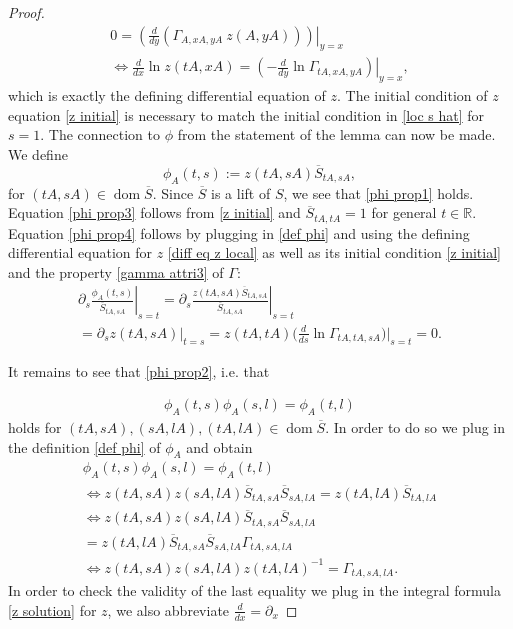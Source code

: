 \documentclass[b5paper,draft,openbib,12pt]{memoir}
\DeclareMathOperator{\dom}{dom}
\begin{document}
\begin{proof}
\begin{align}
0=\left.\left(\frac{d}{dy}(\Gamma_{ A, x A, y A} ~z( A, y A))\right)\right|_{y=x}\\
\iff \frac{d}{dx}\ln z(tA, xA)=\left.\left(-\frac{d}{dy}\ln \Gamma_{t A, xA, yA}\right)\right|_{y=x},
\end{align}
which is exactly the defining differential equation of \(z\). The initial condition of \(z\) equation \eqref{z initial} 
is necessary to match the initial condition in \eqref{loc s hat} for \(s=1\).
The connection to \(\phi\) from the statement of the lemma can now be made.
We define 
\begin{equation}\label{def phi}
\phi_A(t,s):=z(t A, s A) \overline{S}_{t A, s A},
\end{equation}
for \((tA,sA)\in\dom\overline{S}\). Since \(\overline{S}\) is a lift of \(S\), we see that
 \eqref{phi prop1} holds. Equation \eqref{phi prop3} follows from \eqref{z initial} and 
 \(\overline{S}_{tA, tA}=1\) for general \(t\in\mathbb{R}\).
 Equation \eqref{phi prop4} follows by plugging in 
\eqref{def phi} and using the defining differential equation for
 \(z\) \eqref{diff eq z local} as well as its initial 
condition \eqref{z initial} and the property 
\eqref{gamma attri3} of \(\Gamma\):
\begin{align}
\partial_s \left.\frac{\phi_A(t,s)}{\overline{S}_{t A,sA}}\right|_{s=t}
=\partial_s \left.\frac{z(tA,sA)\overline{S}_{t A, sA}}{\overline{S}_{t A, s A}}\right|_{s=t}\\
=\partial_s \left.z(tA, sA)\right|_{t=s}
=z(t A,t A)\bigg(\frac{d}{d s}\ln \Gamma_{t A, t A, s A}\bigg)\bigg|_{s=t}=0.
\end{align}


It remains to see that \eqref{phi prop2}, i.e. that 

\begin{align}\label{consistency phi}
\phi_A(t,s)\phi_A(s,l)=\phi_A(t,l)
\end{align}
holds for \((tA,sA),(sA,lA),(tA,lA)\in\dom\overline{S}\). 
In order to do so we plug in the definition \eqref{def phi} of \(\phi_A\) and obtain
\begin{align}
\phi_A(t,s)\phi_A(s,l)=\phi_A(t,l)\\
\iff z(tA,sA) z(sA,lA)\overline{S}_{tA,sA}\overline{S}_{sA,lA}=z(tA,lA)\overline{S}_{tA,lA}\\
\iff z(tA,sA) z(sA,lA)\overline{S}_{tA,sA}\overline{S}_{sA,lA}\\
=z(tA,lA)\overline{S}_{tA,s A} \overline{S}_{sA,lA}\Gamma_{tA,sA,lA}\\
\iff z(tA,sA) z(sA,lA)z(tA,lA)^{-1}=\Gamma_{tA,sA,lA}.
\end{align}
In order to check the validity of the last equality we plug in the 
integral formula \eqref{z solution} for \(z\), we also abbreviate 
\(\frac{d}{d x}=\partial_x\)


\end{proof}
\end{document}
